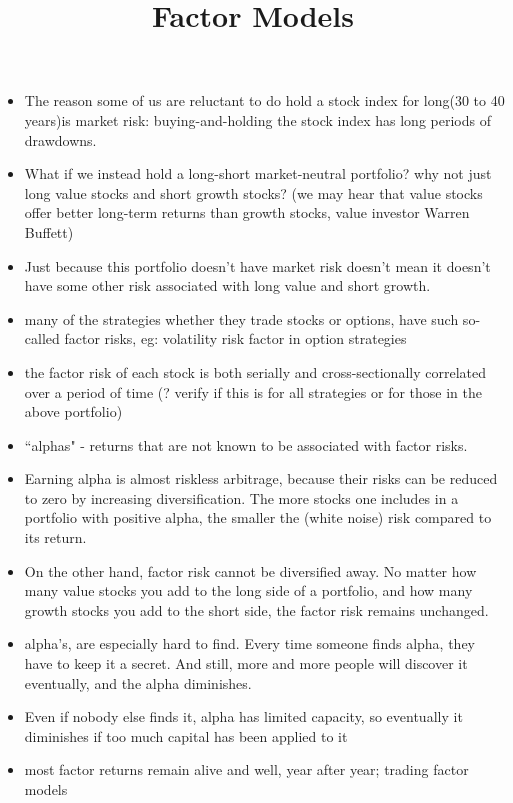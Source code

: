 \documentclass[11pt]{article}
\title{Factor Models}
\date{}
\begin{document}
    \maketitle
    \begin{itemize}
        \item The reason some of us are reluctant to do hold a stock index for long(30 to 40 years)is market risk: buying-and-holding
        the stock index has long periods of drawdowns.
        \item What if we instead hold a long-short market-neutral portfolio? why not just long value stocks and short growth stocks?
        (we may hear that value stocks offer better long-term returns than growth stocks, value investor Warren Buffett)
        \item  Just because this portfolio doesn't have market risk doesn't mean it doesn't have some other risk associated with long value and short growth.
        \item many of the strategies whether they trade stocks or options, have such so-called factor risks, eg: volatility risk factor in option strategies
        \item the factor risk of each stock is both serially and cross-sectionally correlated over a period of time (? verify if this is for all strategies or for
        those in the above portfolio)
        \item ``alphas" - returns that are not known to be associated with factor risks.
        \item Earning alpha is almost riskless arbitrage, because their risks can be reduced to zero by increasing diversification.
        The more stocks one includes in a portfolio with positive alpha, the smaller the (white noise) risk compared to its return.
        \item On the other hand, factor risk cannot be diversified away. No matter how many value stocks you add to the long side of a portfolio,
        and how many growth stocks you add to the short side, the factor risk remains unchanged.
        \item alpha's, are especially hard to find. Every time someone finds alpha, they have to keep it a secret. And still, more and more people will discover it eventually,
        and the alpha diminishes.
        \item Even if nobody else finds it, alpha has limited capacity, so eventually it diminishes if too much capital has been applied to it
        \item most factor returns remain alive and well, year after year; trading factor models

\end{itemize}
\end{document}
